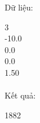 Dữ liệu:  

   3   
\\   -10.0   
\\   0.0   
\\   0.0   
\\   1.50   
\\


\\   Kết quả:  

   1882